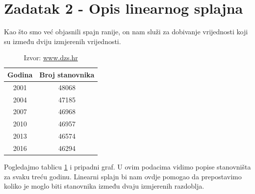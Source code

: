 \documentclass[12pt,a4paper]{report}
\begin{document}
	\section{Zadatak 2 - Opis linearnog splajna}
	
	Kao što smo već objasnili spajn ranije, on nam služi za dobivanje vrijednosti koji su između dviju izmjerenih vrijednosti.
	
	\begin{minipage}{0.4\textwidth}
	\begin{table}[H]
		\begin{tabular}{c c}
			Godina&Broj stanovnika\\\hline
			2001	&	48068	\\
			2004	&	47185	\\
			2007	&	46968	\\
			2010	&	46957	\\
			2013	&	46574	\\
			2016	&	46294	\\
			
		\end{tabular}
	\caption{Izvor: \url{www.dzs.hr}}
	\label{dzsStan}
	\end{table}
	\end{minipage}
	\begin{minipage}{0.6\textwidth}

	
	\end{minipage}
	Pogledajmo tablicu \ref{dzsStan} i pripadni graf. U ovim podacima vidimo popise stanovništa za svaku treću godinu. Linearni splajn bi nam ovdje pomogao da prepostavimo koliko je moglo biti stanovnika između dvaju izmjerenih razdoblja.
	
\end{document}
